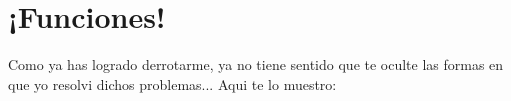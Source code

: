 \section{¡Funciones!}

  Como ya has logrado derrotarme, ya no tiene sentido que te oculte las formas en que yo resolvi dichos problemas... Aqui te lo muestro:
  
  
